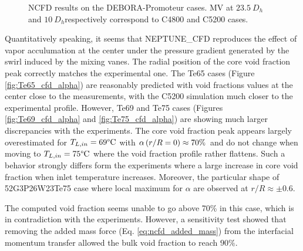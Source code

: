 \begin{figure}[!htb]
{\label{fig:Te69_cfd_Uvap}
}
\caption{NCFD results on the DEBORA-Promoteur cases. MV at $23.5\ D_{h}$ and $10\ D_{h}$respectively correspond to C4800 and C5200 cases.}
\label{fig:debprom_ncfd}
\end{figure}
%



\npar



Quantitatively speaking, it seems that NEPTUNE\_CFD reproduces the effect of vapor acculumation at the center under the pressure gradient generated by the swirl induced by the mixing vanes. The radial position of the core void fraction peak correctly matches the experimental one. The Te65 cases (Figure \ref{fig:Te65_cfd_alpha}) are reasonably predicted with void fractions values at the center close to the measurements, with the C5200 simulation much closer to the experimental profile. However, Te69 and Te75 cases (Figures \ref{fig:Te69_cfd_alpha} and \ref{fig:Te75_cfd_alpha}) are showing much larger discrepancies with the experiments. The core void fraction peak appears largely overestimated for $T_{L,in}=69\degree\mathrm{C}$ with $\alpha\left( r/R= 0 \right) \approx 70\%$ and do not change when moving to $T_{L,in}=75\degree\mathrm{C}$ where the void fraction profile rather flattens. Such a behavior strongly differs form the experiments where a large increase in core void fraction when inlet temperature increases. Moreover, the particular shape of 52G3P26W23Te75 case where local maximum for $\alpha$ are observed at $r/R \approx \pm 0.6$.

\begin{remark*}{}
The computed void fraction seems unable to go above 70\% in this case, which is in contradiction with the experiments. However, a sensitivity test showed that removing the added mass force (Eq. \ref{eq:ncfd_added_mass}) from the interfacial momentum transfer allowed the bulk void fraction to reach $90\%$.
\end{remark*}

